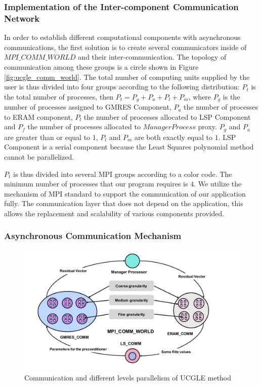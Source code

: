 \subsubsection{Implementation of the Inter-component Communication Network}

In order to establish different computational components with asynchronous communications, the first solution is to create several communicators inside of $MPI\_COMM\_WORLD$ and their inter-communication. The topology of communication among these groups is a circle shown in Figure \ref{fig:ucgle_comm_world}. The total number of computing units supplied by the user is thus divided into four groups according to the following distribution: $P_t$ is the total number of processes, then $P_t = P_g + P_a + P_l + P_m$, where $P_g$ is the number of processes assigned to GMRES Component, $P_a$ the number of processes to ERAM component, $P_l$ the number of processes allocated to LSP Component and $P_f$ the number of processes allocated to $Manager Process$ proxy. $P_g$ and $P_a$ are greater than or equal to $1$, $P_l$ and $P_m$ are both exactly equal to $1$. LSP Component is a serial component because the Least Squares polynomial method cannot be parallelized.

$P_t$ is thus divided into several MPI groups according to a color code. The minimum number of processes that our program requires is $4$. We utilize the mechanism of MPI standard to support the communication of our application fully. The communication layer that does not depend on the application, this allows the replacement and scalability of various components provided.

\subsubsection{Asynchronous Communication Mechanism}

\begin{figure}[t]
	\centering
	\includegraphics[width=0.9\linewidth]{fig/GLSA_MPI.pdf}
	\caption{Communication and different levels parallelism of UCGLE method}
	\label{fig:glsa_mpi}
\end{figure}

